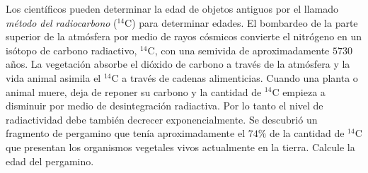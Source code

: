 \item Los científicos pueden determinar la edad de objetos antiguos por el llamado \textit{método del radiocarbono} ($^{14}\text{C}$) para determinar edades. El bombardeo de la parte superior de la atmósfera por medio de rayos cósmicos convierte el nitrógeno en un isótopo de carbono radiactivo, $^{14}\text{C}$, con una semivida de aproximadamente $5730$ años. La vegetación absorbe el dióxido de carbono a través de la atmósfera y la vida animal asimila el $^{14}\text{C}$ a través de cadenas alimenticias. Cuando una planta o animal muere, deja de reponer su carbono y la cantidad de $^{14}\text{C}$ empieza a disminuir por medio de desintegración radiactiva. Por lo tanto el nivel de radiactividad debe también decrecer exponencialmente. Se descubrió un fragmento de pergamino que tenía aproximadamente el $74\%$ de la cantidad de $^{14}\text{C}$ que presentan los organismos vegetales vivos actualmente en la tierra. Calcule la edad del pergamino.
